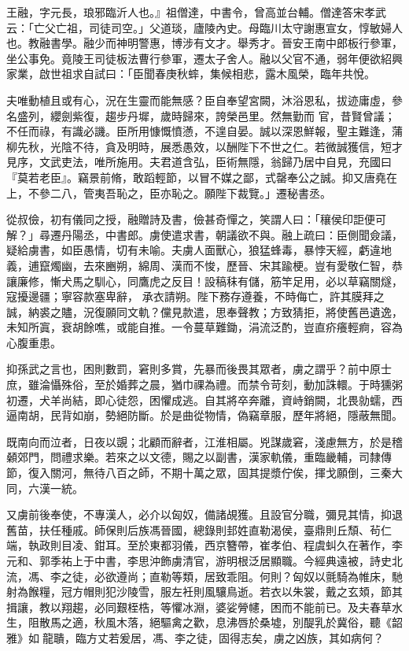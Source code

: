 
\begin{pinyinscope}

 王融，字元長，琅邪臨沂人也。』祖僧達，中書令，曾高並台輔。僧達答宋孝武云：「亡父亡祖，司徒司空。」父道琰，廬陵內史。母臨川太守謝惠宣女，惇敏婦人也。教融書學。融少而神明警惠，博涉有文才。舉秀才。晉安王南中郎板行參軍，坐公事免。竟陵王司徒板法曹行參軍，遷太子舍人。融以父官不通，弱年便欲紹興家業，啟世祖求自試曰：「臣聞春庚秋蟀，集候相悲，露木風榮，臨年共悅。



 夫唯動植且或有心，況在生靈而能無感？臣自奉望宮闕，沐浴恩私，拔迹庸虛，參名盛列，纓劍紫復，趨步丹墀，歲時歸來，誇榮邑里。然無勤而
 官，昔賢曾議；不任而祿，有識必譏。臣所用慷慨憤懣，不遑自晏。誠以深恩鮮報，聖主難逢，蒲柳先秋，光陰不待，貪及明時，展悉愚效，以酬陛下不世之仁。若微誠獲信，短才見序，文武吏法，唯所施用。夫君道含弘，臣術無隱，翁歸乃居中自見，充國曰『莫若老臣』。竊景前脩，敢蹈輕節，以冒不媒之鄙，式罄奉公之誠。抑又唐堯在上，不參二八，管夷吾恥之，臣亦恥之。願陛下裁覽。」遷秘書丞。



 從叔儉，初有儀同之授，融贈詩及書，儉甚奇憚之，笑謂人曰：「穰侯印詎便可解？」尋遷丹陽丞，中書郎。虜使遣求書，朝議欲不與。融上疏曰：臣側聞僉議，疑給虜書，如臣愚情，切有未喻。夫虜人面獸心，狼猛蜂毒，暴悖天經，虧違地義，逋竄燭幽，去來豳朔，綿周、漢而不悛，歷晉、宋其踰梗。豈有愛敬仁智，恭讓廉修，慚犬馬之馴心，同鷹虎之反目！設稿秣有儲，筋竿足用，必以草竊關燧，寇擾邊疆；寧容款塞卑辭，
 承衣請朔。陛下務存遵養，不時侮亡，許其膜拜之誠，納裘之贐，況復願同文軌？儻見款遣，思奉聲教；方致猜拒，將使舊邑遺逸，未知所寘，衰胡餘噍，或能自推。一令蔓草難鋤，涓流泛酌，豈直疥癢輕痾，容為心腹重患。



 抑孫武之言也，困則數罰，窘則多賞，先暴而後畏其眾者，虜之謂乎？前中原士庶，雖淪懾殊俗，至於婚葬之晨，猶巾祼為禮。而禁令苛刻，動加誅轘。于時獯粥初遷，犬羊尚結，即心徒怨，困懼成逃。自其將卒奔離，資峙銷闕，北畏勍蠕，西逼南胡，民背如崩，勢絕防斷。於是曲從物情，偽竊章服，歷年將絕，隱蔽無聞。



 既南向而泣者，日夜以覬；北顧而辭者，江淮相屬。兇謀歲窘，淺慮無方，於是稽顙郊門，問禮求樂。若來之以文德，賜之以副書，漢家軌儀，重臨畿輔，司隸傳節，復入關河，無待八百之師，不期十萬之眾，固其提漿佇俟，揮戈願倒，三秦大同，六漢一統。



 又虜前後奉使，不專漢人，必介以匈奴，備諸覘獲。且設官分職，彌見其情，抑退舊苗，扶任種戚。師保則后族馮晉國，總錄則邽姓直勒渴侯，臺鼎則丘頹、茍仁端，執政則目凌、鉗耳。至於東都羽儀，西京簪帶，崔孝伯、程虞虯久在著作，李元和、郭季祐上于中書，李思沖飾虜清官，游明根泛居顯職。今經典遠被，詩史北流，馮、李之徒，必欲遵尚；直勒等類，居致乖阻。何則？匈奴以氈騎為帷床，馳射為餱糧，冠方帽則犯沙陵雪，服左衽則風驤鳥逝。若衣以朱裳，戴之玄頍，節其揖讓，教以翔趨，必同艱桎梏，等懼冰淵，婆娑膋幰，困而不能前已。及夫春草水生，阻散馬之適，秋風木落，絕驅禽之歡，息沸唇於桑墟，別醍乳於冀俗，聽《韶雅》如龍聵，臨方丈若爰居，馮、李之徒，固得志矣，虜之凶族，其如病何？




\end{pinyinscope}
